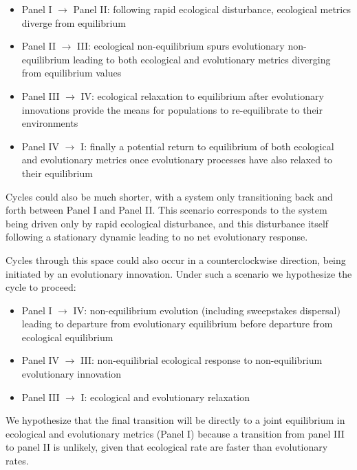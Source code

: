 \documentclass[12pt]{article}
\begin{document}
\begin{itemize}
\item Panel I $\rightarrow$ Panel II: following rapid ecological
  disturbance, ecological metrics diverge from equilibrium
\item Panel II $\rightarrow$ III: ecological non-equilibrium spurs
  evolutionary non-equilibrium leading to both ecological and
  evolutionary metrics diverging from equilibrium values
\item Panel III $\rightarrow$ IV: ecological relaxation to equilibrium
  after evolutionary innovations provide the means for populations to
  re-equilibrate to their environments
\item Panel IV $\rightarrow$ I: finally a potential return to
  equilibrium of both ecological and evolutionary metrics once
  evolutionary processes have also relaxed to their equilibrium
\end{itemize}

Cycles could also be much shorter, with a system only transitioning
back and forth between Panel I and Panel II. This scenario corresponds
to the system being driven only by rapid ecological disturbance, and
this disturbance itself following a stationary dynamic leading to no
net evolutionary response.

Cycles through this space could also occur in a counterclockwise
direction, being initiated by an evolutionary innovation. Under such a
scenario we hypothesize the cycle to proceed:

\begin{itemize}
\item Panel I $\rightarrow$ IV: non-equilibrium evolution (including
  sweepstakes dispersal) leading to departure from evolutionary
  equilibrium before departure from ecological equilibrium
\item Panel IV $\rightarrow$ III: non-equilibrial ecological response
  to non-equilibrium evolutionary innovation
\item Panel III $\rightarrow$ I: ecological and evolutionary
  relaxation
\end{itemize}

We hypothesize that the final transition will be directly to a joint
equilibrium in ecological and evolutionary metrics (Panel I) because a
transition from panel III to panel II is unlikely, given that
ecological rate are faster than evolutionary rates.
\end{document}
